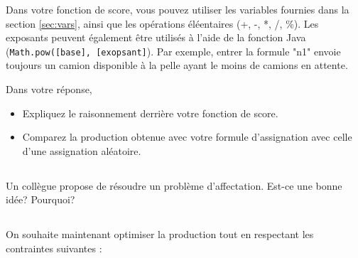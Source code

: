 \documentclass[letterpaper,12pt]{article}
\begin{document}
	Dans votre fonction de score, vous pouvez utiliser les variables fournies dans la section \ref{sec:vars}, ainsi que les opérations éléentaires (+, -, *, /, \%). Les exposants peuvent également être utilisés à l'aide de la fonction Java (\verb!Math.pow([base], [exopsant]!). Par exemple, entrer la formule "n1" envoie toujours un camion disponible à la pelle ayant le moins de camions en attente.
	
	Dans votre réponse, 
	\begin{itemize}
		\item Expliquez le raisonnement derrière votre fonction de score.
		\item Comparez la production obtenue avec votre formule d'assignation avec celle d'une assignation aléatoire.
	\end{itemize}
	
	
	\subsection{}
	
	Un collègue propose de résoudre un problème d'affectation. Est-ce une bonne idée? Pourquoi?

	
	

	
	\subsection{}
	
	
	On souhaite maintenant optimiser la production tout en respectant les contraintes suivantes : 
	
\end{document}
